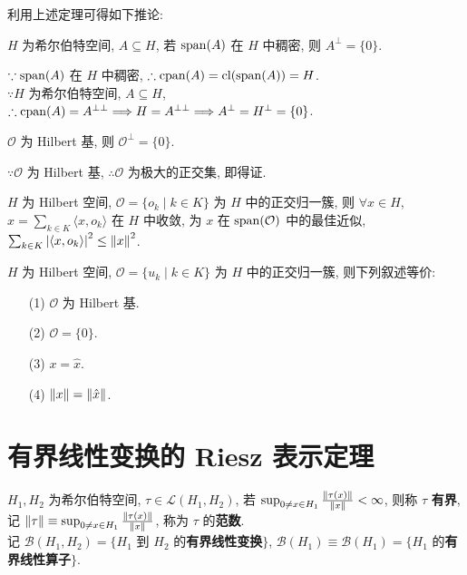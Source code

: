 \documentclass{note}
\begin{document}
利用上述定理可得如下推论:
\begin{thm}[(课本定理 13.14)]
    $H$ 为希尔伯特空间, $A\subseteq H$, 若 $\operatorname{span}(A)$ 在 $H$ 中稠密, 则 $A^{\perp}=\{0\}$.
\end{thm}
\begin{pf}
    $\because\operatorname{span}(A)$ 在 $H$ 中稠密, $\therefore\operatorname{cpan}(A)=\operatorname{cl}(\operatorname{span}(A))=H$.\\
    $\because H$ 为希尔伯特空间, $A\subseteq H$, $\therefore\operatorname{cpan}(A)=A^{\perp\perp}\Longrightarrow H=A^{\perp\perp}\Longrightarrow A^{\perp}=H^{\perp}=\{0\}$.\\
\end{pf}

\begin{thm}[(课本定理 13.15)]
    $\mathcal{O}$ 为 Hilbert 基, 则 $\mathcal{O}^{\perp}=\{0\}$.
\end{thm}
\begin{pf}
    $\because\mathcal{O}$ 为 Hilbert 基, $\therefore\mathcal{O}$ 为极大的正交集, 即得证.
\end{pf}

\begin{thm}[(课本定理 13.25)]
    $H$ 为 Hilbert 空间, $\mathcal{O}=\{o_k\mid k\in K\}$ 为 $H$ 中的正交归一簇, 则 $\forall x\in H$, $\hat{x}=\sum_{k\in K}\langle x,o_k\rangle$ 在 $H$ 中收敛, 为 $x$ 在 $\operatorname{span}(\mathcal{O})$ 中的最佳近似, $\sum_{k\in K}\left\lvert\langle x,o_k\rangle\right\rvert^2\leq\left\lVert x\right\rVert^2$.
\end{thm}

\begin{thm}[(课本定理 13.26)]
    $H$ 为 Hilbert 空间, $\mathcal{O}=\{u_k\mid k\in K\}$ 为 $H$ 中的正交归一簇, 则下列叙述等价:
    \begin{itemize}
        \item[(1)] $\mathcal{O}$ 为 Hilbert 基.
        \item[(2)] $\mathcal{O}=\{0\}$.
        \item[(3)] $x=\hat{x}$.
        \item[(4)] $\left\lVert x\right\rVert=\left\lVert\hat{x}\right\rVert$.
    \end{itemize}
\end{thm}

\section{有界线性变换的 Riesz 表示定理}
\begin{df}[有界线性变换]
    $H_1,H_2$ 为希尔伯特空间, $\tau\in\mathcal{L}(H_1,H_2)$, 若 $\sup_{0\neq x\in H_1}\frac{\left\lVert\tau(x)\right\rVert}{\left\lVert x\right\rVert}<\infty$, 则称 $\tau$ \textbf{有界}, 记 $\left\lVert\tau\right\rVert\equiv\sup_{0\neq x\in H_1}\frac{\left\lVert\tau(x)\right\rVert}{\left\lVert x\right\rVert}$, 称为 $\tau$ 的\textbf{范数}.\\
    记 $\mathcal{B}(H_1,H_2)=\{H_1$ 到 $H_2$ 的\textbf{有界线性变换}$\}$, $\mathcal{B}(H_1)\equiv\mathcal{B}(H_1)=\{H_1$ 的\textbf{有界线性算子}$\}$.
\end{df}
\end{document}
